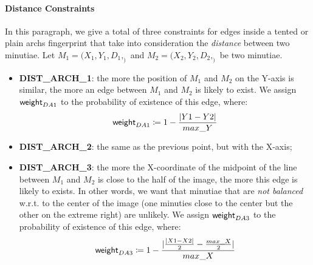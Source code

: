 \documentclass[8pt]{article}
\begin{document}
\paragraph{Distance Constraints}
In this paragraph, we give a total of three constraints for edges inside
a tented or plain archs fingerprint that take into consideration the
\emph{distance} between two minutiae.
Let $M_1=(X_1,Y_1,D_1,_)$ and $M_2=(X_2,Y_2,D_2,_)$ be two minutiae.
  \begin{itemize}
    \item \textbf{DIST\_ARCH\_1}: the more the position of $M_1$ and $M_2$
          on the Y-axis is similar, the more an edge between $M_1$ and $M_2$
          is likely to exist. We assign $\textsf{weight}_{DA1}$ to the probability
          of existence of this edge, where:
            \begin{align*}
              \textsf{weight}_{DA1} \coloneqq 1-\frac{\lvert Y1-Y2\rvert}{max\_Y}
            \end{align*}
    \item \textbf{DIST\_ARCH\_2}: the same as the previous point, but with
          the X-axis;
    \item \textbf{DIST\_ARCH\_3}: the more the X-coordinate of the midpoint of 
          the line between $M_1$ and $M_2$ is close to the half of the image,
          the more this edge is likely to exists. In other words, we want that
          minutiae that are \emph{not balanced} w.r.t. to the center of the
          image (\eg one minuties close to the center but the other on the 
          extreme right) are unlikely. We assign $\textsf{weight}_{DA3}$ to the 
          probability of existence of this edge, where:
            \begin{align*}
              \textsf{weight}_{DA3} \coloneqq 1 -
              \frac{\lvert \frac{\lvert X1-X2 \rvert}{2} - \frac{max\_X}{2}
              \rvert}{max\_X}
            \end{align*}
  \end{itemize}
\end{document}
